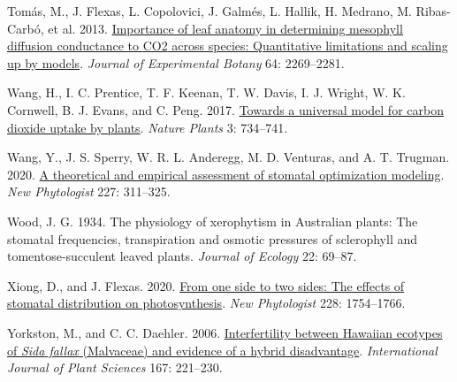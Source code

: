 \documentclass[
  letterpaper,
  DIV=11,
  numbers=noendperiod]{scrartcl}
\newlength{\cslhangindent}
\newlength{\cslentryspacingunit} %
\newenvironment{CSLReferences}[2] %
 {%
  \setlength{\parindent}{0pt}
  \ifodd #1
  \let\oldpar\par
  \def\par{\hangindent=\cslhangindent\oldpar}
  \fi
  \setlength{\parskip}{#2\cslentryspacingunit}
 }%
 {}
\begin{document}
\begin{CSLReferences}{1}{0}
\leavevmode{}%
Tomás, M., J. Flexas, L. Copolovici, J. Galmés, L. Hallik, H. Medrano,
M. Ribas-Carbó, et al. 2013.
\href{https://doi.org/10.1093/jxb/ert086}{Importance of leaf anatomy in
determining mesophyll diffusion conductance to {CO2} across species:
Quantitative limitations and scaling up by models}. \emph{Journal of
Experimental Botany} 64: 2269--2281.

\leavevmode{}%
Wang, H., I. C. Prentice, T. F. Keenan, T. W. Davis, I. J. Wright, W. K.
Cornwell, B. J. Evans, and C. Peng. 2017.
\href{https://doi.org/10.1038/s41477-017-0006-8}{Towards a universal
model for carbon dioxide uptake by plants}. \emph{Nature Plants} 3:
734--741.

\leavevmode{}%
Wang, Y., J. S. Sperry, W. R. L. Anderegg, M. D. Venturas, and A. T.
Trugman. 2020. \href{https://doi.org/10.1111/nph.16572}{A theoretical
and empirical assessment of stomatal optimization modeling}. \emph{New
Phytologist} 227: 311--325.

\leavevmode{}%
Wood, J. G. 1934. The physiology of xerophytism in {Australian} plants:
The stomatal frequencies, transpiration and osmotic pressures of
sclerophyll and tomentose-succulent leaved plants. \emph{Journal of
Ecology} 22: 69--87.

\leavevmode{}%
Xiong, D., and J. Flexas. 2020.
\href{https://doi.org/10.1111/nph.16801}{From one side to two sides: The
effects of stomatal distribution on photosynthesis}. \emph{New
Phytologist} 228: 1754--1766.

\leavevmode{}%
Yorkston, M., and C. C. Daehler. 2006.
\href{https://doi.org/10.1086/499615}{Interfertility between {Hawaiian}
ecotypes of \emph{{Sida} fallax} ({Malvaceae}) and evidence of a hybrid
disadvantage}. \emph{International Journal of Plant Sciences} 167:
221--230.

\end{CSLReferences}
\end{document}
